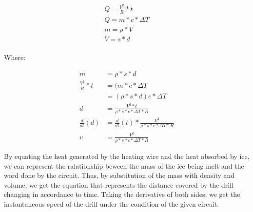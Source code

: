 \documentclass{article}
\begin{document}
\begin{gather*}
    Q = \frac{V^2}{R}*t \\
    Q = m*c*\Delta T \\
    m = \rho * V \\
    V = s*d \\
\end{gather*}

Where:

\begin{align*}
    m &= \rho * s*d \\
    \frac{V^2}{R}*t &= (m*c*\Delta T \\
    &= (\rho * s*d) c * \Delta T \\
    d &= \frac{V^2 * t}{\rho *s*c*\Delta T*R} \\
    \frac{d}{dt}(d) &= \frac{d}{dt}(t)* \frac{V^2}{\rho *s*c*\Delta T*R} \\
    v &= \frac{V^2}{\rho *s*c*\Delta T*R}
\end{align*}

By equating the heat generated by the heating wire and the heat absorbed by ice, we can represent the ralationship beween the mass of the ice being melt and the word done by the circuit. Thus, by substitution of the mass with density and volume, we get the equation that represents the distance covered by the drill changing in accordance to time. Taking the derivative of both sides, we get the instantaneous speed of the drill under the condition of the given circuit. \par
\end{document}
